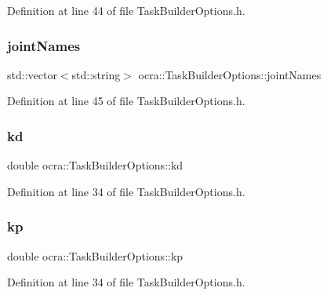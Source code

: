 Definition at line 44 of file Task\+Builder\+Options.\+h.

\hypertarget{classocra_1_1TaskBuilderOptions_ab72b4855028ef6965107294b16818ad2}{}\label{classocra_1_1TaskBuilderOptions_ab72b4855028ef6965107294b16818ad2} 
\subsubsection{\texorpdfstring{joint\+Names}{jointNames}}
{\footnotesize\ttfamily std\+::vector$<$std\+::string$>$ ocra\+::\+Task\+Builder\+Options\+::joint\+Names}



Definition at line 45 of file Task\+Builder\+Options.\+h.

\hypertarget{classocra_1_1TaskBuilderOptions_aad265cbbd4016246362cfd6fc375b479}{}\label{classocra_1_1TaskBuilderOptions_aad265cbbd4016246362cfd6fc375b479} 
\subsubsection{\texorpdfstring{kd}{kd}}
{\footnotesize\ttfamily double ocra\+::\+Task\+Builder\+Options\+::kd}



Definition at line 34 of file Task\+Builder\+Options.\+h.

\hypertarget{classocra_1_1TaskBuilderOptions_ad2f50a4fc0ac5e7c48048cb6a123cce6}{}\label{classocra_1_1TaskBuilderOptions_ad2f50a4fc0ac5e7c48048cb6a123cce6} 
\subsubsection{\texorpdfstring{kp}{kp}}
{\footnotesize\ttfamily double ocra\+::\+Task\+Builder\+Options\+::kp}



Definition at line 34 of file Task\+Builder\+Options.\+h.

\hypertarget{classocra_1_1TaskBuilderOptions_acecc869663607553145b3322e3828547}{}\label{classocra_1_1TaskBuilderOptions_acecc869663607553145b3322e3828547} 
